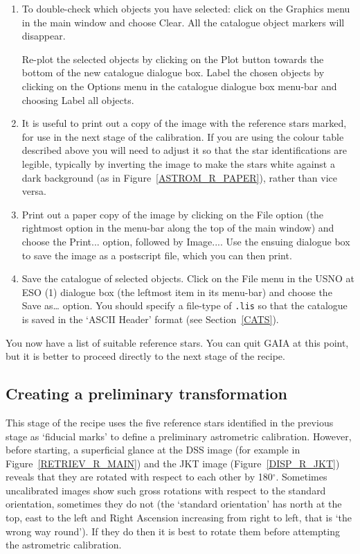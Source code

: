 \documentclass[twoside,11pt]{starlink}
\begin{document}
\begin{enumerate}
  \item To double-check which objects you have selected: click on the \textsf{Graphics} menu in the main window and choose \textsf{Clear}.  All the
   catalogue object markers will disappear.

   Re-plot the selected objects by clicking on the \textsf{Plot} button towards
   the bottom of the new catalogue dialogue box.  Label the chosen objects
   by clicking on the \textsf{Options} menu in the catalogue dialogue box
   menu-bar and choosing \textsf{Label all objects}.

  \item It is useful to print out a copy of the image with the reference
   stars marked, for use in the next stage of the calibration.  If you are
   using the colour table described above you will need to adjust it so
   that the star identifications are legible, typically by inverting the
   image to make the stars white against a dark background (as in
   Figure~\ref{ASTROM_R_PAPER}), rather than vice versa.

  \item Print out a paper copy of the image by clicking on the \textsf{File}
   option (the rightmost option in the menu-bar along the top of the main
   window) and choose the \textsf{Print...} option, followed by \textsf{Image...}.
   Use the ensuing dialogue box to save the image as a postscript file,
   which you can then print.

  \item Save the catalogue of selected objects.  Click on the \textsf{File}
   menu in the \textsf{USNO at ESO (1)} dialogue box (the leftmost item in its
   menu-bar) and choose the \textsf{Save as\ldots} option.  You should specify
   a file-type of \texttt{.lis} so that the catalogue is saved in the `ASCII
   Header' format (see Section~\ref{CATS}).

\end{enumerate}

You now have a list of suitable reference stars. You can quit GAIA at this
point, but it is better to proceed directly to the next stage of the
recipe.

\subsection{Creating a preliminary transformation}

This stage of the recipe uses the five reference stars identified in the
previous stage as `fiducial marks' to define a preliminary astrometric
calibration.  However, before starting, a superficial glance at the
DSS image (for example in Figure~\ref{RETRIEV_R_MAIN}) and the
JKT image (Figure~\ref{DISP_R_JKT}) reveals that they are rotated with
respect to each other by 180$^{\circ}$.  Sometimes uncalibrated images
show such gross rotations with respect to the standard orientation,
sometimes they do not (the `standard orientation' has north at the top,
east to the left and Right Ascension increasing from right to left, that
is `the wrong way round').  If they do then it is best to rotate them
before attempting the astrometric calibration.
\end{document}
